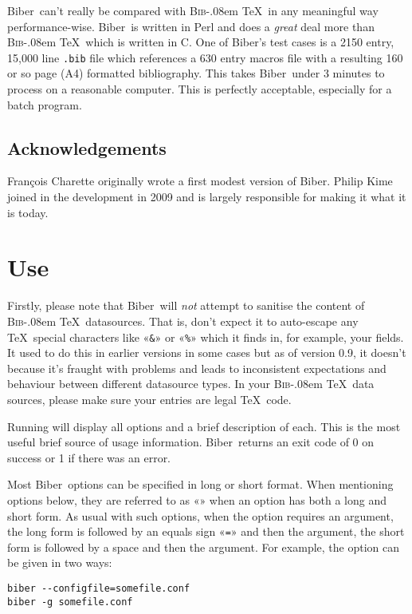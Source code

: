 \documentclass{ltxdockit}
\def\BibTeX{\textsc{Bib}\kern-.08em \TeX}
\newcommand*{\biber}{Biber\xspace}
\begin{document}
\biber\ can't really be compared with \BibTeX\ in any meaningful
way performance-wise. \biber\ is written in Perl and does a
\emph{great} deal more than \BibTeX\ which is written in C. One of
\biber's test cases is a 2150 entry, 15,000 line \verb+.bib+ file
which references a 630 entry macros file with a resulting 160 or so page (A4)
formatted bibliography. This takes \biber\ under 3 minutes to process on
a reasonable computer. This is perfectly acceptable, especially for a
batch program.

\subsection{Acknowledgements}

François Charette originally wrote a first modest version of \biber. Philip Kime joined in
the development in 2009 and is largely responsible for making it what it is today. 

\section{Use}

Firstly, please note that \biber\ will \emph{not} attempt to sanitise
the content of \BibTeX\ datasources. That is, don't expect it to
auto-escape any \TeX\ special characters like «\verb+&+» or «\verb+%+» which
it finds in, for example, your  fields. It used to do this in
earlier versions in some cases but as of version 0.9, it doesn't because
it's fraught with problems and leads to inconsistent expectations and
behaviour between different datasource types. In your \BibTeX\ data
sources, please make sure your entries are legal \TeX\ code.

Running  will display all options and a brief
description of each. This is the most useful brief source of usage
information. \biber\ returns an exit code of 0 on success or 1 if
there was an error.

Most \biber\ options can be specified in long or short format. When
mentioning options below, they are referred to as
«» when an option has both a long and short
form. As usual with such options, when the option requires an argument, the
long form is followed by an equals sign «\verb+=+» and then the argument,
the short form is followed by a space and then the argument. For example,
the  option can be given in two ways:

\begin{verbatim}
biber --configfile=somefile.conf
biber -g somefile.conf
\end{verbatim}
\end{document}
